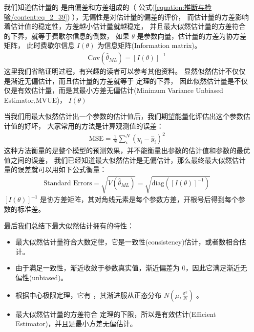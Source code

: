 \documentclass[letterpaper,10pt,english]{sphinxmanual}
\begin{document}
我们知道估计量的  是由偏差和方差组成的（ 公式(\ref{equation:推断与检验/content:eq_2_39}) ），无偏性是对估计量的偏差的评价，
而估计量的方差影响着估计值的稳定性，方差越小估计量就越稳定，
并且最大似然估计量的方差符合  的下界，就等于费歇尔信息的倒数，
如果 \(\theta\) 是参数向量，估计量的方差为协方差矩阵，
此时费歇尔信息 \(I(\theta)\)
为信息矩阵(Information matrix)。
\begin{equation}\label{equation:推断与检验/content:eq_2_60}
\begin{split}\text{Cov}(\hat{\theta}_{ML}) = [I(\theta)]^{-1}\end{split}
\end{equation}
这里我们省略证明过程，有兴趣的读者可以参考其他资料。
显然似然估计不仅仅是渐近无偏估计，而且估计量的方差就等于  定理的下界，
因此似然估计量是不仅仅是有效估计量，而是其最小方差无偏估计(Minimum Variance Unbiased Estimator,MVUE)，
 \(I(\theta)\) 

当我们用最大似然估计出一个参数的估计值后，我们期望能量化评估出这个参数估计值的好坏，
大家常用的方法是计算观测值的误差：
\begin{equation}\label{equation:推断与检验/content:推断与检验/content:72}
\begin{split}\text{MSE} = \frac{1}{N} \sum_i^N (y_i-\hat{y}_i)^2\end{split}
\end{equation}
这种方法衡量的是整个模型的预测效果，并不能衡量出参数的估计值和参数的最优值之间的误差，
我们已经知道最大似然估计是无偏估计，那么最终最大似然估计量的误差就可以用如下公式衡量：
\begin{equation}\label{equation:推断与检验/content:推断与检验/content:73}
\begin{split}\text{Standard Errors} = \sqrt{V(\hat{\theta}_{ML})} = \sqrt{ \text{diag} ([I(\theta)]^{-1})}\end{split}
\end{equation}
\([I(\theta)]^{-1}\) 是协方差矩阵，其对角线元素是每个参数方差，开根号后得到每个参数的标准差。

最后我们总结下最大似然估计拥有的特性：
\begin{itemize}
\item {} 
最大似然估计量符合大数定律，它是一致性(consistency)估计，或者数相合估计。

\item {} 
由于满足一致性，渐近收敛于参数真实值，渐近偏差为 \(0\)，因此它满足渐近无偏性(unbiased)。

\item {} 
根据中心极限定理，它有  ，其渐进服从正态分布 \(N(\mu,\frac{\sigma^2}{N})\) 。

\item {} 
最大似然估计量的方差符合  定理的下限，所以是有效估计(Efficient Estimator)，并且是最小方差无偏估计。

\end{itemize}
\end{document}
